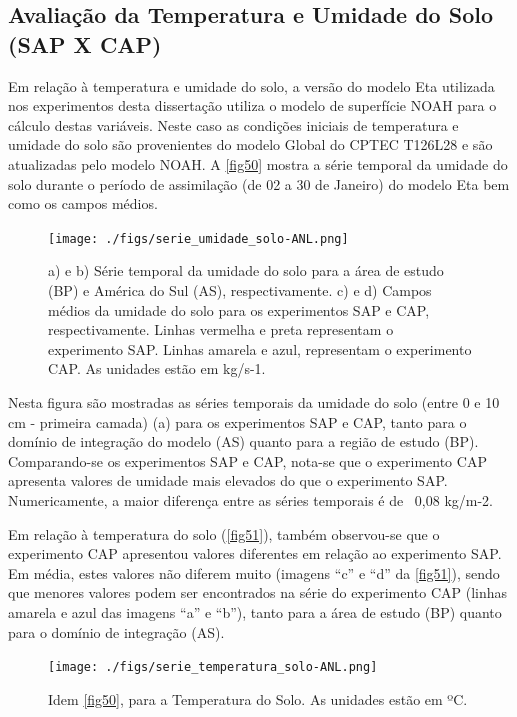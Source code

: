 \subsection{Avaliação da Temperatura e Umidade do Solo (SAP X CAP)}
\label{ss:avaltempumi}

Em relação à temperatura e umidade do solo, a versão do modelo Eta utilizada nos experimentos desta dissertação utiliza o modelo de superfície NOAH para o cálculo destas variáveis. Neste caso as condições iniciais de temperatura e umidade do solo são provenientes do modelo Global do CPTEC T126L28 e são atualizadas pelo modelo NOAH. A \autoref{fig50} mostra a série temporal da umidade do solo durante o período de assimilação (de 02 a 30 de Janeiro) do modelo Eta bem como os campos médios.

\begin{figure}[!hbp]
\centering
\texttt{[image: ./figs/serie\_umidade\_solo-ANL.png]}
\caption{a) e b) Série temporal da umidade do solo para a área de estudo (BP) e América do Sul (AS), respectivamente. c) e d) Campos médios da umidade do solo para os experimentos SAP e CAP, respectivamente. Linhas vermelha e preta representam o experimento SAP. Linhas amarela e azul, representam o experimento CAP. As unidades estão em kg/s-1.}
\label{fig50}
\end{figure}

Nesta figura são mostradas as séries temporais da umidade do solo (entre 0 e 10 cm - primeira camada) (a) para os experimentos SAP e CAP, tanto para o domínio de integração do modelo (AS) quanto para a região de estudo (BP). Comparando-se os experimentos SAP e CAP, nota-se que o experimento CAP apresenta valores de umidade mais elevados do que o experimento SAP. Numericamente, a maior diferença entre as séries temporais é de ~0,08 kg/m-2.

Em relação à temperatura do solo (\autoref{fig51}), também observou-se que o experimento CAP apresentou valores diferentes em relação ao experimento SAP. Em média, estes valores não diferem muito (imagens ``c'' e ``d'' da \autoref{fig51}), sendo que menores valores podem ser encontrados na série do experimento CAP (linhas amarela e azul das imagens ``a'' e ``b''), tanto para a área de estudo (BP) quanto para o domínio de integração (AS).

\begin{figure}[!hbp]
\centering
\texttt{[image: ./figs/serie\_temperatura\_solo-ANL.png]}
\caption{Idem \autoref{fig50}, para a Temperatura do Solo. As unidades estão em ºC.}
\label{fig51}
\end{figure}

